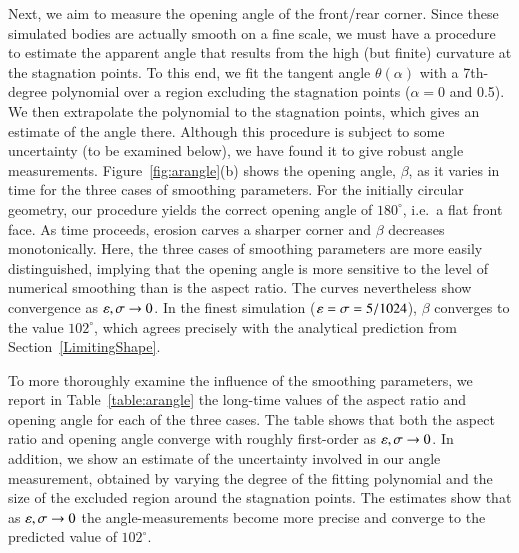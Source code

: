 \documentclass[preprint, 10pt]{elsarticle}
\begin{document}
	Next, we aim to measure the opening angle of the front/rear
        corner. Since these simulated bodies are actually smooth on a
        fine scale, we must have a procedure to estimate the apparent
        angle that results from the high (but finite) curvature at the
        stagnation points. To this end, we fit the tangent angle
        $\theta(\alpha)$ with a 7th-degree polynomial over a region
        excluding the stagnation points ($\alpha = 0$ and 0.5). We then
        extrapolate the polynomial to the stagnation points, which gives
        an estimate of the angle there. Although this procedure is
        subject to some uncertainty (to be examined below), we have
        found it to give robust angle measurements.
        Figure~\ref{fig:arangle}(b) shows the opening angle, $\beta$, as
        it varies in time for the three cases of smoothing parameters.
        For the initially circular geometry, our procedure yields the
        correct opening angle of $180^{\circ}$, i.e.~a flat front face.
        As time proceeds, erosion carves a sharper corner and $\beta$
        decreases monotonically. Here, the three cases of smoothing
        parameters are more easily distinguished, implying that the
        opening angle is more sensitive to the level of numerical
        smoothing than is the aspect ratio. The curves nevertheless show
        convergence as $\varepsilon, \sigma \to 0$. In the finest simulation
        ($\varepsilon = \sigma = 5/1024$), $\beta$ converges to the value
        $102^{\circ}$, which agrees precisely with the analytical
        prediction from Section~\ref{LimitingShape}. 

	To more thoroughly examine the influence of the smoothing parameters, we report in Table~\ref{table:arangle} the long-time values of the aspect ratio and opening angle for each of the three cases. The table shows that both the aspect ratio and opening angle converge with roughly first-order as $\varepsilon, \sigma \to 0$. In addition, we show an estimate of the uncertainty involved in our angle measurement, obtained by varying the degree of the fitting polynomial and the size of the excluded region around the stagnation points. The estimates show that as $\varepsilon, \sigma \to 0$ the angle-measurements become more precise and converge to the predicted value of $102^{\circ}$.
\end{document}
